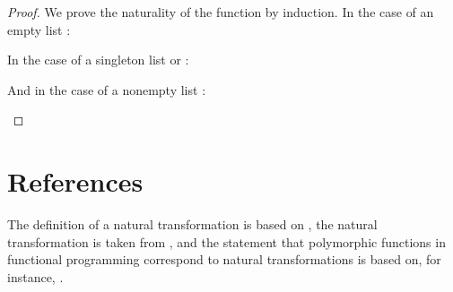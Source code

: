 \begin{example}
\begin{proof}
    We prove the naturality of the  function by
    induction. In the case of an empty list \texthaskell{[]}:
    \begin{steps}
    \end{steps}
    In the case of a singleton list \texthaskell{[x]} or
    :
    \begin{steps}
    \end{steps}
    And in the case of a nonempty list :
    \begin{steps}
        \eqbyihh{}
    \end{steps}

  \end{proof}

\end{example}

\section{References}
\label{sec:naturals-references}

The definition of a natural transformation is based on
\parencites[16]{maclane-1998}[435--436]{poigne-1992}, the \nat{\eta}
natural transformation is taken from \parencite[11]{marquis-2013}, and
the statement that polymorphic functions in functional programming
correspond to natural transformations is based on, for instance,
\parencites[34]{bird-demoor-1997}[78]{elkins-2009}[435,
  436]{poigne-1992}[48,
  49]{rydeheard-1986}[113]{rydeheard-1988}[350]{wadler-1989}.

\clearemptydoublepage
